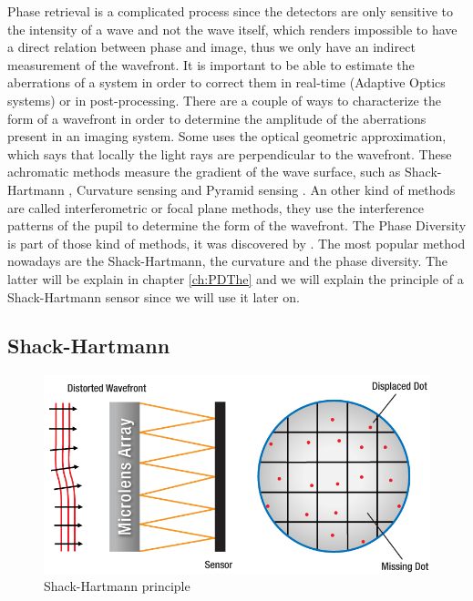Phase retrieval is a complicated process since the detectors are only sensitive to the intensity of a wave and not the wave itself, which renders impossible to have a direct relation between phase and image, thus we only have an indirect measurement of the wavefront. It is important to be able to estimate the aberrations of a system in order to correct them in real-time (Adaptive Optics systems) or in post-processing.  There are a couple of ways to characterize the form of a wavefront in order to determine the amplitude of the aberrations present in an imaging system. Some uses the optical geometric approximation, which says that locally the light rays are perpendicular to the wavefront. These achromatic methods measure the gradient of the wave surface, such as Shack-Hartmann \citep{ShackPlatt_1971}, Curvature sensing \citep{Roddier1988} and Pyramid sensing \citep{ragazzoni1996}. An other kind of methods are called interferometric or focal plane methods, they use the interference patterns of the pupil to determine the form of the wavefront. The Phase Diversity is part of those kind of methods, it was discovered by \citet{GerchberSaxton1972,Gonsalve_1982}. The most popular method nowadays are the Shack-Hartmann, the curvature and the phase diversity. The latter will be explain in chapter \ref{ch:PDThe} and we will explain the principle of a Shack-Hartmann sensor since we will use it later on.


\subsection[Shack-Hartmann]{Shack-Hartmann \citep{ShackPlatt_1971}}

\begin{figure}
\begin{center}
\includegraphics[width=\textwidth,angle=0]{Figures/SHWFSPrinciple}
\decoRule
\caption[Shack-Hartmann principle]{Shack-Hartmann principle \citep{SHWFS}}
\label{fig:SHWFSPrinciple}
\end{center}
\end{figure}

